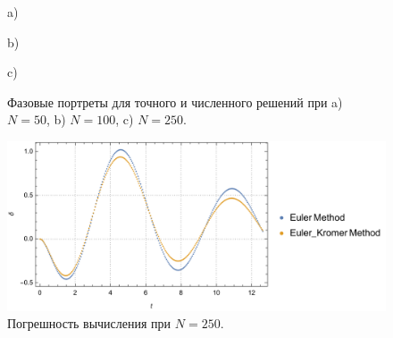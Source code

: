 \documentclass[
11pt,
master, %
subf, %
href, %
colorlinks=true, %
times, %
]{disser}
\begin{document}
\newpage
\begin{figure}[h!]
\begin{minipage}[h]{1\linewidth}
 a) \\
\end{minipage}
\vfill
\begin{minipage}[h]{1\linewidth}
 b) \\
\end{minipage}
\vfill
\begin{minipage}[h]{1\linewidth}
 c) \\
\end{minipage}
\caption{Фазовые портреты для точного и численного решений при a) $N = 50$, b) $N = 100$, c) $N = 250$.}
\label{ris:6}
\end{figure}

\newpage
\begin{figure}[h]
  \centering
  \includegraphics[width=1\linewidth]{plRESer1_250}
  \caption{Погрешность вычисления при $N = 250$.}
  \label{ris:7}
\end{figure}
\end{document}
